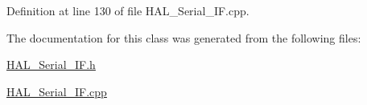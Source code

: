Definition at line 130 of file H\+A\+L\+\_\+\+Serial\+\_\+\+I\+F.\+cpp.



The documentation for this class was generated from the following files\+:\begin{DoxyCompactItemize}
\item 
\mbox{\hyperlink{_h_a_l___serial___i_f_8h}{H\+A\+L\+\_\+\+Serial\+\_\+\+I\+F.\+h}}\item 
\mbox{\hyperlink{_h_a_l___serial___i_f_8cpp}{H\+A\+L\+\_\+\+Serial\+\_\+\+I\+F.\+cpp}}\end{DoxyCompactItemize}
